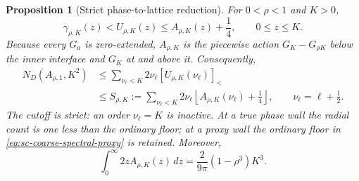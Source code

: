 \documentclass[11pt]{article}
\numberwithin{equation}{section}
\newtheorem{proposition}[theorem]{Proposition}
\theoremstyle{definition}
\theoremstyle{remark}
\begin{document}
\begin{proposition}[Strict phase-to-lattice reduction]
\label{prop:sc-phase-lattice}
For \(0<\rho<1\) and \(K>0\),
\begin{equation}
  \gamma_{\rho,K}(z)<U_{\rho,K}(z)
  \le A_{\rho,K}(z)+\frac14,
  \qquad 0\le z\le K.
  \label{eq:sc-pointwise-phase-proxy}
\end{equation}
Because every \(G_a\) is zero-extended, \(A_{\rho,K}\) is the piecewise
action \(G_K-G_{\rho K}\) below the inner interface and \(G_K\) at and
above it.  Consequently,
\begin{align}
  N_D(A_{\rho,1},K^2)
  &\le
  \sum_{\nu_\ell<K}2\nu_\ell
  [U_{\rho,K}(\nu_\ell)]_<
  \label{eq:sc-optimized-spectral-proxy}\\
  &\le
  S_{\rho,K}:=
  \sum_{\nu_\ell<K}2\nu_\ell
  \left\lfloor A_{\rho,K}(\nu_\ell)+\frac14\right\rfloor,
  \qquad \nu_\ell=\ell+\frac12.
  \label{eq:sc-coarse-spectral-proxy}
\end{align}
The cutoff is strict: an order \(\nu_\ell=K\) is inactive.  At a true phase
wall the radial count is one less than the ordinary floor; at a proxy wall
the ordinary floor in \eqref{eq:sc-coarse-spectral-proxy} is retained.
Moreover,
\begin{equation}
  \int_0^\infty2zA_{\rho,K}(z)\,dz
  =\frac{2}{9\pi}(1-\rho^3)K^3.
  \label{eq:sc-exact-action-integral}
\end{equation}
\end{proposition}
\end{document}
